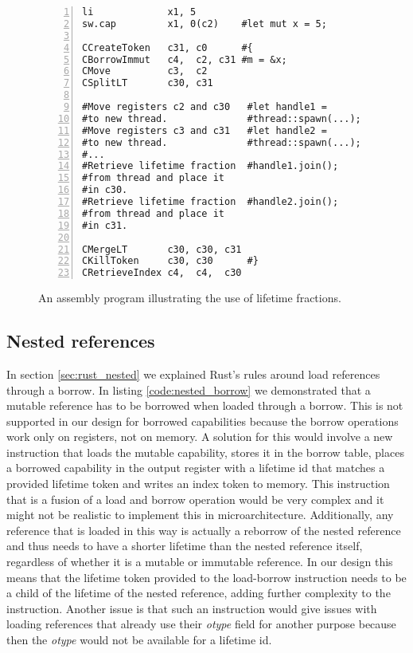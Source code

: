 \begin{figure}[h]
\begin{lstlisting}[style=custASM, numbers = left ,xleftmargin=1.5em]
li             x1, 5
sw.cap         x1, 0(c2)    #let mut x = 5;

CCreateToken   c31, c0      #{
CBorrowImmut   c4,  c2, c31 #m = &x;
CMove          c3,  c2
CSplitLT       c30, c31

#Move registers c2 and c30   #let handle1 =
#to new thread.              #thread::spawn(...);
#Move registers c3 and c31   #let handle2 =
#to new thread.              #thread::spawn(...);
#...
#Retrieve lifetime fraction  #handle1.join();
#from thread and place it
#in c30.
#Retrieve lifetime fraction  #handle2.join();
#from thread and place it
#in c31.

CMergeLT       c30, c30, c31
CKillToken     c30, c30      #}
CRetrieveIndex c4,  c4,  c30
\end{lstlisting}
\caption{An assembly program illustrating the use of lifetime fractions.}
\label{fig:asmthreadexample}
\end{figure}

\subsection{Nested references}
\label{sec:nestedrefeval}
In section \ref{sec:rust_nested} we explained Rust's rules around load references through a borrow.
In listing \ref{code:nested_borrow} we demonstrated that a mutable reference has to be borrowed when loaded through a borrow.
This is not supported in our design for borrowed capabilities because the borrow operations work only on registers, not on memory.
A solution for this would involve a new instruction that loads the mutable capability, stores it in the borrow table, places a borrowed capability in the output register with a lifetime id that matches a provided lifetime token and writes an index token to memory.
This instruction that is a fusion of a load and borrow operation would be very complex and it might not be realistic to implement this in microarchitecture.
Additionally, any reference that is loaded in this way is actually a reborrow of the nested reference and thus needs to have a shorter lifetime than the nested reference itself, regardless of whether it is a mutable or immutable reference.
In our design this means that the lifetime token provided to the load-borrow instruction needs to be a child of the lifetime of the nested reference, adding further complexity to the instruction.
Another issue is that such an instruction would give issues with loading references that already use their \textit{otype} field for another purpose because then the \textit{otype} would not be available for a lifetime id.

